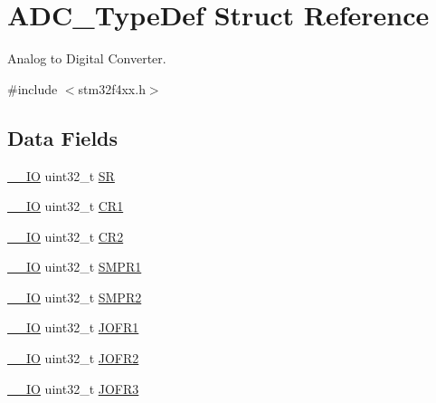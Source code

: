 \hypertarget{struct_a_d_c___type_def}{}\section{A\+D\+C\+\_\+\+Type\+Def Struct Reference}
\label{struct_a_d_c___type_def}


Analog to Digital Converter.  




{\ttfamily \#include $<$stm32f4xx.\+h$>$}

\subsection*{Data Fields}
\begin{DoxyCompactItemize}
\item 
\hyperlink{group___c_m_s_i_s__core__definitions_gaec43007d9998a0a0e01faede4133d6be}{\+\_\+\+\_\+\+IO} uint32\+\_\+t \hyperlink{struct_a_d_c___type_def_af6aca2bbd40c0fb6df7c3aebe224a360}{SR}
\item 
\hyperlink{group___c_m_s_i_s__core__definitions_gaec43007d9998a0a0e01faede4133d6be}{\+\_\+\+\_\+\+IO} uint32\+\_\+t \hyperlink{struct_a_d_c___type_def_ab0ec7102960640751d44e92ddac994f0}{C\+R1}
\item 
\hyperlink{group___c_m_s_i_s__core__definitions_gaec43007d9998a0a0e01faede4133d6be}{\+\_\+\+\_\+\+IO} uint32\+\_\+t \hyperlink{struct_a_d_c___type_def_afdfa307571967afb1d97943e982b6586}{C\+R2}
\item 
\hyperlink{group___c_m_s_i_s__core__definitions_gaec43007d9998a0a0e01faede4133d6be}{\+\_\+\+\_\+\+IO} uint32\+\_\+t \hyperlink{struct_a_d_c___type_def_af9d6c604e365c7d9d7601bf4ef373498}{S\+M\+P\+R1}
\item 
\hyperlink{group___c_m_s_i_s__core__definitions_gaec43007d9998a0a0e01faede4133d6be}{\+\_\+\+\_\+\+IO} uint32\+\_\+t \hyperlink{struct_a_d_c___type_def_a6ac83fae8377c7b7fcae50fa4211b0e8}{S\+M\+P\+R2}
\item 
\hyperlink{group___c_m_s_i_s__core__definitions_gaec43007d9998a0a0e01faede4133d6be}{\+\_\+\+\_\+\+IO} uint32\+\_\+t \hyperlink{struct_a_d_c___type_def_a427dda1678f254bd98b1f321d7194a3b}{J\+O\+F\+R1}
\item 
\hyperlink{group___c_m_s_i_s__core__definitions_gaec43007d9998a0a0e01faede4133d6be}{\+\_\+\+\_\+\+IO} uint32\+\_\+t \hyperlink{struct_a_d_c___type_def_a11e65074b9f06b48c17cdfa5bea9f125}{J\+O\+F\+R2}
\item 
\hyperlink{group___c_m_s_i_s__core__definitions_gaec43007d9998a0a0e01faede4133d6be}{\+\_\+\+\_\+\+IO} uint32\+\_\+t \hyperlink{struct_a_d_c___type_def_a613f6b76d20c1a513976b920ecd7f4f8}{J\+O\+F\+R3}

\end{DoxyCompactItemize}
